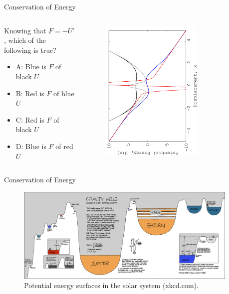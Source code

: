 \documentclass{beamer}
\begin{document}
\begin{frame}{Conservation of Energy}
\begin{columns}[T]
\begin{column}{0.3\textwidth}
\small
Knowing that $F = -U'$, which of the following is true?
\begin{itemize}
\item A: Blue is $F$ of black $U$
\item B: Red is $F$ of blue $U$
\item C: Red is $F$ of black $U$
\item D: Blue is $F$ of red $U$
\end{itemize}
\end{column}
\begin{column}{0.7\textwidth}
\begin{figure}
\centering
\includegraphics[width=0.7\textwidth,angle=270]{figures/Nov14_plot4.jpg}
\end{figure}
\end{column}
\end{columns}
\end{frame}

\begin{frame}{Conservation of Energy}
\begin{figure}
\centering
\includegraphics[width=0.95\textwidth]{figures/gravity_wells_large.png}
\caption{\label{fig:well} Potential energy surfaces in the solar system (xkcd.com).}
\end{figure}
\end{frame}
\end{document}
